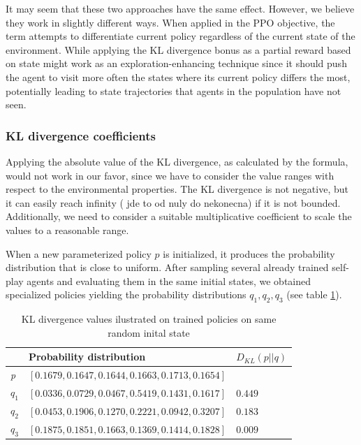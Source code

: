 It may seem that these two approaches have the same effect.
However, we believe they work in slightly different ways.
When applied in the PPO objective, the term attempts to differentiate current policy regardless of the current state of the environment.
While applying the KL divergence bonus as a partial reward based on state might work as an exploration-enhancing technique since it should push the agent to visit more often the states where its current policy differs the most, potentially leading to state trajectories that agents in the population have not seen.

\subsubsection{KL divergence coefficients}
Applying the absolute value of the KL divergence, as calculated by the formula, would not work in our favor, since we have to consider the value ranges with respect to the environmental properties.
The KL divergence is not negative, but it can easily reach infinity ({\color{blue} jde to od nuly do nekonecna}) if it is not bounded.
Additionally, we need to consider a suitable multiplicative coefficient to scale the values to a reasonable range.

When a new parameterized policy $p$ is initialized, it produces the probability distribution that is close to uniform.
After sampling several already trained self-play agents and evaluating them in the same initial states, we obtained specialized policies yielding the probability distributions $q_1, q_2, q_3$ (see table \ref{tab:KLDiv-distributions}).


\begin{table}[htbp]
    \small
    \centering
    \begin{tabular}{lll}
      \toprule
      \                                & Probability distribution     & $D_{KL}(p||q)$         \\ \midrule
      \textit{p}     &$[0.1679, 0.1647, 0.1644, 0.1663, 0.1713, 0.1654]$                                   &                                   \\ \midrule            
      $q_1$                     & $[0.0336, 0.0729, 0.0467, 0.5419, 0.1431, 0.1617]$                            & $0.449$                            \\
      $q_2$                         & $[0.0453, 0.1906, 0.1270, 0.2221, 0.0942, 0.3207]$                            & $0.183$                            \\
      $q_3$                                & $[0.1875, 0.1851, 0.1663, 0.1369, 0.1414, 0.1828]$                         & $0.009$                               \\
      
     \bottomrule
    \end{tabular}
    \caption{KL divergence values ilustrated on trained policies on same random inital state}
    \label{tab:KLDiv-distributions}
\end{table}

